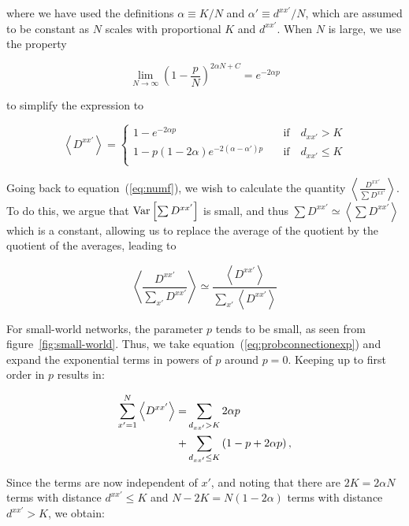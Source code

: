 \noindent where we have used the definitions $\alpha \equiv K/N$ and $\alpha' \equiv d^{xx'}/N$, which are assumed to be constant as
$N$ scales with proportional $K$ and $d^{xx'}$. When $N$ is large, we use the property

\begin{equation*}
  \lim_{N\to \infty}\left( 1 - \frac{p}{N} \right)^{2\alpha N + C} = e^{-2\alpha p}
\end{equation*}

\noindent to simplify the expression to

\begin{equation}
  \left<D^{xx'}\right> =
  \begin{cases}
    1-e^{-2\alpha p} \quad &\text{if} \quad d_{xx'}>K \\
    1-p\left( 1 - 2\alpha \right)e^{-2(\alpha-\alpha')p} \quad &\text{if} \quad d_{xx'}\leq K\\
  \end{cases}
  \label{eq:probconnectionexp}
\end{equation}

Going back to equation~(\ref{eq:numf}), we wish to calculate the quantity $\left< \frac{D^{xx'}}{\sum D^{xx'}} \right>$. To do this, we
argue that $\text{Var}\left[{\sum D^{xx'}}\right]$ is small, and thus $\sum D^{xx'} \simeq \left< \sum D^{xx'} \right>$ which is a constant, allowing us
to replace the average of the quotient by the quotient of the averages, leading to

\begin{equation}
    \left< \frac{D^{xx'}}{\sum_{x'}D^{xx'}} \right> \simeq \frac{\left< D^{xx'} \right>}{\sum_{x'}\left< D^{xx'} \right>}
    \label{eq:avgquotient}
\end{equation}

\noindent For small-world networks, the parameter $p$ tends to be small\cite{rodrigues2020synchronization}, as seen from
figure~\ref{fig:small-world}. Thus, we take equation~(\ref{eq:probconnectionexp}) and expand the exponential terms in powers of $p$
around $p=0$. Keeping up to first order in $p$ results in:

\begin{align}
  \sum_{x'=1}^N \left< D^{xx'} \right> = &
  \sum_{d_{xx'}>K} 2\alpha p \notag \\
  + &
  \sum_{d_{xx'}\leq K} \left( 1 - p + 2\alpha p \right),
\end{align}

Since the terms are now independent of $x'$, and noting that there are $2K=2\alpha N$ terms with distance $d^{xx'}\leq K$ and
$N-2K=N(1-2\alpha)$ terms with distance $d^{xx'}>K$, we obtain:

